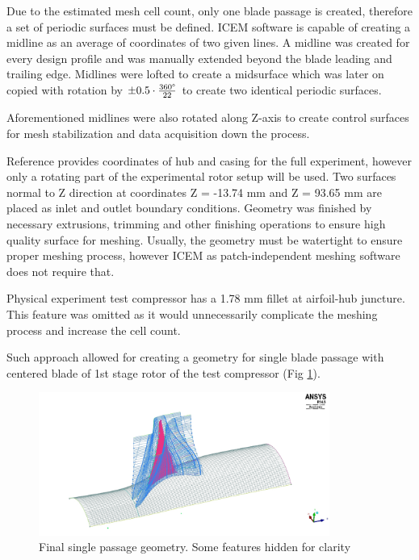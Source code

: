 Due to the estimated mesh cell count, only one blade passage is created, therefore a set of periodic surfaces must be defined. ICEM software is capable of creating a midline as an average of coordinates of two given lines. A midline was created for every design profile and was manually extended beyond the blade leading and trailing edge. Midlines were lofted to create a midsurface which was later on copied with rotation by $\pm 0.5 \cdot \frac{360 \degree}{22}$ to create two identical periodic surfaces.

Aforementioned midlines were also rotated along Z-axis to create control surfaces for mesh stabilization and data acquisition down the process.

Reference \citep{r67laser} provides coordinates of hub and casing for the full experiment, however only a rotating part of the experimental rotor setup will be used. Two surfaces normal to Z direction at coordinates Z = -13.74 mm and Z = 93.65 mm are placed as inlet and outlet boundary conditions. Geometry was finished by necessary extrusions, trimming and other finishing operations to ensure high quality surface for meshing. Usually, the geometry must be watertight  to ensure proper meshing process, however ICEM as patch-independent meshing software does not require that.

Physical experiment test compressor has a 1.78 mm fillet at airfoil-hub juncture. This feature was omitted as it would unnecessarily complicate the meshing process and increase the cell count.

Such approach allowed for creating a geometry for single blade passage with centered blade of 1st stage rotor of the test compressor (Fig \ref{geom_final}).

\begin{figure}[ht!]
\centering %
\includegraphics[width=0.85\textwidth]{Pictures/r67_geom.jpg}
\caption{Final single passage geometry. Some features hidden for clarity}
\label{geom_final}
\end{figure}

